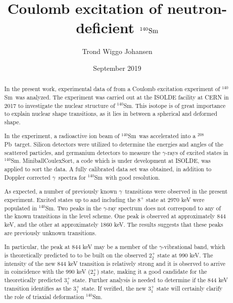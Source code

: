 \documentclass[twoside,english]{uiofysmaster/uiofysmaster}
\author{Trond Wiggo Johansen}
\title{Coulomb excitation of neutron-deficient $\textnormal{\Sm}$}
\date{September 2019}
\newcommand{\Sm}{$^{140}$Sm} %
\newcommand{\Pb}{$^{208}$Pb}
\newcommand{\ga}{$\gamma$}
\begin{document}
\setlength{\belowdisplayskip}{12pt} \setlength{\belowdisplayshortskip}{12pt}
\setlength{\abovedisplayskip}{12pt} \setlength{\abovedisplayshortskip}{12pt}

\maketitle


\begin{abstract}
In the present work, experimental data of from a Coulomb excitation experiment of \Sm\ was analyzed. The experiment was carried out at the ISOLDE facility at CERN in 2017 to investigate the nuclear structure of \Sm. This isotope is of great importance to explain nuclear shape transitions, as it lies in between a spherical and deformed shape.

In the experiment, a radioactive ion beam of \Sm\ was accelerated into a \Pb\ target.
Silicon detectors were utilized to determine the energies and angles of the scattered particles, and germanium detectors to measure the \ga-rays of excited states in \Sm. 
MiniballCoulexSort, a code which is under development at ISOLDE, was applied to sort the data.
A fully calibrated data set was obtained, in addition to Doppler corrected \ga\ spectra for \Sm\ with good resolution. 

As expected, a number of previously known \ga\ transitions were observed in the present experiment.
Excited states up to and including the $8^+$ state at 2970 keV were populated in \Sm.
Two peaks in the \ga-ray spectrum does not correspond to any of the known transitions in the level scheme. One peak is observed at approximately 844 keV, and the other at approximately 1860 keV. The results suggests that these peaks are previously unknown transitions. 

In particular, the peak at 844 keV may be a member of the \ga-vibrational band, which is theoretically predicted to to be built on the observed $2_2^+$ state at 990 keV. The intensity of the new 844 keV transition is relatively strong and it is observed to arrive in coincidence with the 990 keV ($2_2^+$) state, making it a good candidate for the theoretically predicted $3_1^+$ state. Further analysis is needed to determine if the 844 keV transition identifies as the $3_1^+$ state. If verified, the new $3_1^+$ state will certainly clarify the role of triaxial deformation \Sm. 
\end{abstract}
\end{document}
